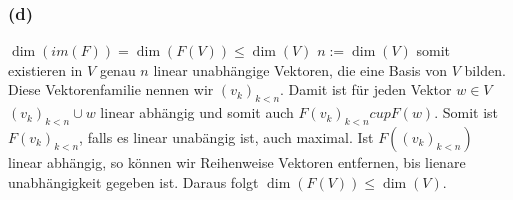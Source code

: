 \documentclass[12pt]{article}
\begin{document}
\subsubsection*{(d)}$\dim(im(F))=\dim(F(V)){\leq}\dim(V)$
$n:=\dim(V)$ somit existieren in $V$ genau $n$ linear unabh{\"a}ngige Vektoren, die eine Basis von $V$ bilden. Diese Vektorenfamilie nennen wir $(v_k)_{k<n}$. Damit ist f{\"u}r jeden Vektor $w \in V$ $(v_k)_{k<n}{\cup}w$ linear abh{\"a}ngig und somit auch $F(v_k)_{k<n}{cup}F(w)$. Somit ist $F(v_k)_{k<n}$, falls es linear unab{\"a}ngig ist, auch maximal. Ist $F((v_k)_{k<n})$ linear abh{\"a}ngig, so k{\"o}nnen wir Reihenweise Vektoren entfernen, bis lienare unabh{\"a}ngigkeit gegeben ist. Daraus folgt $\dim(F(V))\leq\dim(V)$.
\end{document}
